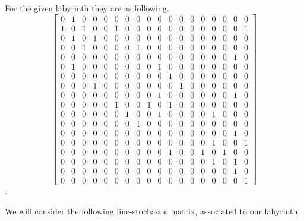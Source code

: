 \documentclass{article}
\begin{document}
For the given labyrinth they are as following.
\setcounter{MaxMatrixCols}{20}
$$\begin{bmatrix}
0 & 1 & 0 & 0 & 0 & 0 & 0 & 0 & 0 & 0 & 0 & 0 & 0 & 0 & 0 & 0 & 0 & 0\\
1 & 0 & 1 & 0 & 0 & 1 & 0 & 0 & 0 & 0 & 0 & 0 & 0 & 0 & 0 & 0 & 0 & 1\\
0 & 1 & 0 & 1 & 0 & 0 & 0 & 0 & 0 & 0 & 0 & 0 & 0 & 0 & 0 & 0 & 0 & 0\\
0 & 0 & 1 & 0 & 0 & 0 & 0 & 1 & 0 & 0 & 0 & 0 & 0 & 0 & 0 & 0 & 0 & 0\\
0 & 0 & 0 & 0 & 0 & 0 & 0 & 0 & 0 & 0 & 0 & 0 & 0 & 0 & 0 & 0 & 1 & 0\\
0 & 1 & 0 & 0 & 0 & 0 & 0 & 0 & 0 & 1 & 0 & 0 & 0 & 0 & 0 & 0 & 0 & 0\\
0 & 0 & 0 & 0 & 0 & 0 & 0 & 0 & 0 & 0 & 1 & 0 & 0 & 0 & 0 & 0 & 0 & 0\\
0 & 0 & 0 & 1 & 0 & 0 & 0 & 0 & 0 & 0 & 0 & 1 & 0 & 0 & 0 & 0 & 0 & 0\\
0 & 0 & 0 & 0 & 0 & 0 & 0 & 0 & 0 & 1 & 0 & 0 & 0 & 0 & 0 & 0 & 1 & 0\\
0 & 0 & 0 & 0 & 0 & 1 & 0 & 0 & 1 & 0 & 1 & 0 & 0 & 0 & 0 & 0 & 0 & 0\\
0 & 0 & 0 & 0 & 0 & 0 & 1 & 0 & 0 & 1 & 0 & 0 & 0 & 0 & 1 & 0 & 0 & 0\\
0 & 0 & 0 & 0 & 0 & 0 & 0 & 1 & 0 & 0 & 0 & 0 & 0 & 0 & 0 & 0 & 0 & 0\\
0 & 0 & 0 & 0 & 0 & 0 & 0 & 0 & 0 & 0 & 0 & 0 & 0 & 0 & 0 & 0 & 1 & 0\\
0 & 0 & 0 & 0 & 0 & 0 & 0 & 0 & 0 & 0 & 0 & 0 & 0 & 0 & 1 & 0 & 0 & 1\\
0 & 0 & 0 & 0 & 0 & 0 & 0 & 0 & 0 & 0 & 1 & 0 & 0 & 1 & 0 & 1 & 0 & 0\\
0 & 0 & 0 & 0 & 0 & 0 & 0 & 0 & 0 & 0 & 0 & 0 & 0 & 0 & 1 & 0 & 1 & 0\\
0 & 0 & 0 & 0 & 0 & 0 & 0 & 0 & 0 & 0 & 0 & 0 & 0 & 0 & 0 & 0 & 1 & 0\\
0 & 0 & 0 & 0 & 0 & 0 & 0 & 0 & 0 & 0 & 0 & 0 & 0 & 0 & 0 & 0 & 0 & 1
\end{bmatrix}$$.

We will consider the following line-stochastic matrix, associated to our labyrinth.
\end{document}
